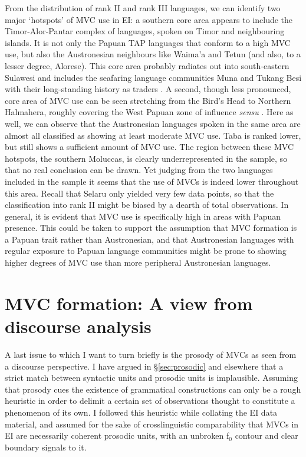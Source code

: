 From the distribution of rank II and rank III languages, we can identify two major `hotspots' of MVC use in EI: a southern core area appears to include the Timor-Alor-Pantar complex of languages, spoken on Timor and neighbouring islands. It is not only the Papuan TAP languages that conform to a high MVC use, but also the Austronesian neighbours like Waima'a and Tetun (and also, to a lesser degree, Alorese). This core area probably radiates out into south-eastern Sulawesi and includes the seafaring language communities Muna and Tukang Besi with their long-standing history as traders \citep{donohue1999}. A second, though less pronounced, core area of MVC use can be seen stretching from the Bird's Head to Northern Halmahera, roughly covering the West Papuan zone of influence \textit{sensu} \citet{reesink2005west}. Here as well, we can observe that the Austronesian languages spoken in the same area are almost all classified as showing at least moderate MVC use. Taba is ranked lower, but still shows a sufficient amount of MVC use. The region between these MVC hotspots, the southern Moluccas, is clearly underrepresented in the sample, so that no real conclusion can be drawn. Yet judging from the two languages included in the sample it seems that the use of MVCs is indeed lower throughout this area. Recall that Selaru only yielded very few data points, so that the classification into rank II might be biased by a dearth of total observations. In general, it is evident that MVC use is specifically high in areas with Papuan presence. This could be taken to support the assumption that MVC formation is a Papuan trait rather than Austronesian, and that Austronesian languages with regular exposure to Papuan language communities might be prone to showing higher degrees of MVC use than more peripheral Austronesian languages.

\section{MVC formation: A view from discourse analysis} \label{sec:discourse}

A last issue to which I want to turn briefly is the prosody of MVCs as seen from a discourse perspective. I have argued in §\ref{sec:prosodic} and elsewhere that a strict match between syntactic units and prosodic units is implausible. Assuming that prosody cues the existence of grammatical constructions can only be a rough heuristic in order to delimit a certain set of observations thought to constitute a phenomenon of its own. I followed this heuristic while collating the EI data material, and assumed for the sake of crosslinguistic comparability that MVCs in EI are necessarily coherent prosodic units, with an unbroken f$_0$ contour and clear boundary signals to it.

